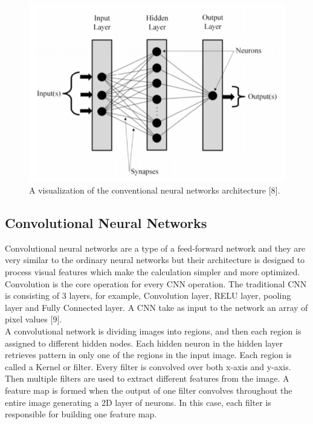 \begin{figure}[ht]
\centering
\includegraphics{Figures/ca}
\decoRule
\caption[A visualization of the conventional neural networks architecture "8"]{A visualization of the conventional neural networks architecture [8].}
\label{fig:la}
\end{figure}
\subsection{Convolutional Neural Networks}
\hspace{5mm} Convolutional neural networks are a type of a feed-forward network and they are very similar to the ordinary neural networks but their architecture is designed to process visual features which make the calculation simpler and more optimized. Convolution is the core operation for every CNN operation. The traditional CNN is consisting of 3 layers, for example, Convolution layer, RELU layer, pooling layer and Fully Connected layer. A CNN take as input to the network an array of pixel values [9].\\

A convolutional network is dividing images into regions, and then each region is assigned to different hidden nodes. Each hidden neuron in the hidden layer retrieves pattern in only one of the regions in the input image. Each region is called a Kernel or filter. Every filter is convolved over both x-axis and y-axis. Then multiple filters are used to extract different features from the image. A feature map is formed when the output of one filter convolves throughout the entire image generating a 2D layer of neurons. In this case, each filter is responsible for building one feature map.\\

